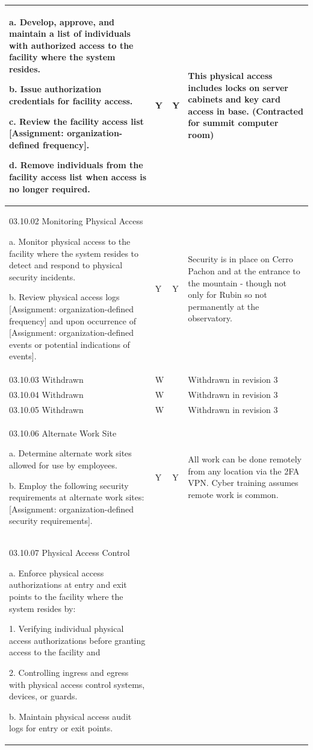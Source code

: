 \begin{longtable} {|p{}|p{}|p{}|p{} |}
{a. Develop, approve, and maintain a list of individuals with authorized access to the facility where the system resides.

b. Issue authorization credentials for facility access.

c. Review the facility access list [Assignment: organization-defined frequency].

d. Remove individuals from the facility access list when access is no longer required.}&{Y}&{Y}&{This physical access includes locks on server cabinets and key card access in base. (Contracted for summit computer room) } \\ \hline
{03.10.02 Monitoring Physical Access

a. Monitor physical access to the facility where the system resides to detect and respond to physical security incidents.

b. Review physical access logs [Assignment: organization-defined frequency] and upon occurrence of [Assignment: organization-defined events or potential indications of events].}&{Y}&{Y}&{Security is in place on Cerro Pachon and at the entrance to the mountain - though not only for Rubin so not permanently at the observatory. } \\ \hline
{03.10.03 Withdrawn}&{W}&{}&{Withdrawn in revision 3} \\ \hline
{03.10.04 Withdrawn}&{W}&{}&{Withdrawn in revision 3} \\ \hline
{03.10.05 Withdrawn}&{W}&{}&{Withdrawn in revision 3} \\ \hline
{03.10.06 Alternate Work Site

a. Determine alternate work sites allowed for use by employees.

b. Employ the following security requirements at alternate work sites: [Assignment: organization-defined security requirements].}&{Y}&{Y}&{All work can be done remotely from any location via the 2FA VPN. Cyber training assumes remote work is common.} \\ \hline
{03.10.07 Physical Access Control

a. Enforce physical access authorizations at entry and exit points to the facility where the system resides by:

1. Verifying individual physical access authorizations before granting access to the facility and

2. Controlling ingress and egress with physical access control systems, devices, or guards.

b. Maintain physical access audit logs for entry or exit points.

}
\end{longtable}
